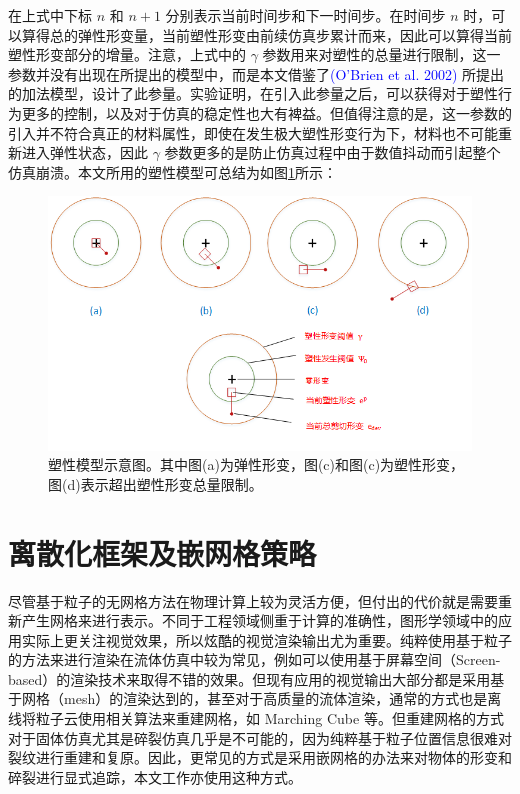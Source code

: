 在上式中下标 $n$ 和 $n + 1$ 分别表示当前时间步和下一时间步。在时间步 $n$ 时，可以算得总的弹性形变量，当前塑性形变由前续仿真步累计而来，因此可以算得当前塑性形变部分的增量。注意，上式中的 $\gamma$ 参数用来对塑性的总量进行限制，这一参数并没有出现在所提出的模型中，而是本文借鉴了\textcolor{blue}{(O'Brien et al. 2002)\supercite{OBrien2002}} 所提出的加法模型，设计了此参量。实验证明，在引入此参量之后，可以获得对于塑性行为更多的控制，以及对于仿真的稳定性也大有裨益。但值得注意的是，这一参数的引入并不符合真正的材料属性，即使在发生极大塑性形变行为下，材料也不可能重新进入弹性状态，因此 $\gamma$ 参数更多的是防止仿真过程中由于数值抖动而引起整个仿真崩溃。本文所用的塑性模型可总结为如图\ref{plasticity_model}所示：

\begin{figure}[!htb]
  \centering
  \captionsetup{justification=centering}
  \includegraphics[width=\linewidth]{chap/image/plasticity_model}

  \caption{\label{plasticity_model}
           塑性模型示意图。其中图(a)为弹性形变，图(c)和图(c)为塑性形变，图(d)表示超出塑性形变总量限制。
          }
\end{figure}


\section{离散化框架及嵌网格策略}
\label{discretization}

尽管基于粒子的无网格方法在物理计算上较为灵活方便，但付出的代价就是需要重新产生网格来进行表示。不同于工程领域侧重于计算的准确性，图形学领域中的应用实际上更关注视觉效果，所以炫酷的视觉渲染输出尤为重要。纯粹使用基于粒子的方法来进行渲染在流体仿真中较为常见，例如可以使用基于屏幕空间（Screen-based）的渲染技术来取得不错的效果。但现有应用的视觉输出大部分都是采用基于网格（mesh）的渲染达到的，甚至对于高质量的流体渲染，通常的方式也是离线将粒子云使用相关算法来重建网格，如 Marching Cube 等。但重建网格的方式对于固体仿真尤其是碎裂仿真几乎是不可能的，因为纯粹基于粒子位置信息很难对裂纹进行重建和复原。因此，更常见的方式是采用嵌网格的办法来对物体的形变和碎裂进行显式追踪，本文工作亦使用这种方式。

